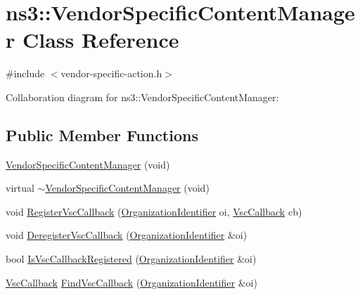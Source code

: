 \hypertarget{classns3_1_1VendorSpecificContentManager}{}\section{ns3\+:\+:Vendor\+Specific\+Content\+Manager Class Reference}
\label{classns3_1_1VendorSpecificContentManager}


{\ttfamily \#include $<$vendor-\/specific-\/action.\+h$>$}



Collaboration diagram for ns3\+:\+:Vendor\+Specific\+Content\+Manager\+:
\subsection*{Public Member Functions}
\begin{DoxyCompactItemize}
\item 
\hyperlink{classns3_1_1VendorSpecificContentManager_a74f900197a2a25eb7dfebc0c06e08043}{Vendor\+Specific\+Content\+Manager} (void)
\item 
virtual \hyperlink{classns3_1_1VendorSpecificContentManager_af47b1837968ebbec778a06209255e093}{$\sim$\+Vendor\+Specific\+Content\+Manager} (void)
\item 
void \hyperlink{classns3_1_1VendorSpecificContentManager_a133e95911bc4e010e2cf7d4f2472d6fe}{Register\+Vsc\+Callback} (\hyperlink{classns3_1_1OrganizationIdentifier}{Organization\+Identifier} oi, \hyperlink{namespacens3_acd51abe7aaf87942dfd56b0e5e1f899f}{Vsc\+Callback} cb)
\item 
void \hyperlink{classns3_1_1VendorSpecificContentManager_abe2645201542dd7165365be27f1a5b89}{Deregister\+Vsc\+Callback} (\hyperlink{classns3_1_1OrganizationIdentifier}{Organization\+Identifier} \&oi)
\item 
bool \hyperlink{classns3_1_1VendorSpecificContentManager_a5c1df1cbbfa463323ef7284cc83ac4c6}{Is\+Vsc\+Callback\+Registered} (\hyperlink{classns3_1_1OrganizationIdentifier}{Organization\+Identifier} \&oi)
\item 
\hyperlink{namespacens3_acd51abe7aaf87942dfd56b0e5e1f899f}{Vsc\+Callback} \hyperlink{classns3_1_1VendorSpecificContentManager_a827f6989ad72041a9e126a144a002e54}{Find\+Vsc\+Callback} (\hyperlink{classns3_1_1OrganizationIdentifier}{Organization\+Identifier} \&oi)
\end{DoxyCompactItemize}
